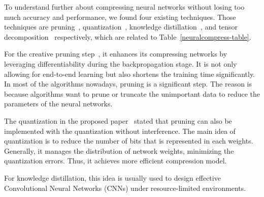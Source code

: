 \documentclass{article}
\begin{document}

To understand further about compressing neural networks without losing too much accuracy and performance, we found four existing techniques. Those techniques are pruning~\cite{cheng2020survey}, quantization~\cite{pal2020autoencoding}, knowledge distillation~\cite{gol2021control}, and tensor decomposition~\cite{pal2020autoencoding} respectively, which are related to Table~\ref{neuralcompress-table}. 

For the creative pruning step~\cite{cheng2020survey}, it enhances its compressing networks by leveraging differentiability during the backpropagation stage. It is not only allowing for end-to-end learning but also shortens the training time significantly. In most of the algorithms nowadays, pruning is a significant step. The reason is because algorithms want to prune or truncate the unimportant data to reduce the parameters of the neural networks. 

The quantization in the proposed paper~\cite{pal2020autoencoding} stated that pruning can also be implemented with the quantization without interference. The main idea of quantization is to reduce the number of bits that is represented in each weights. Generally, it manages the distribution of network weights, minimizing the quantization errors. Thus, it achieves more efficient compression model. 

For knowledge distillation, this idea is usually used to design effective Convolutional Neural Networks (CNNs) under resource-limited environments. 
\end{document}
